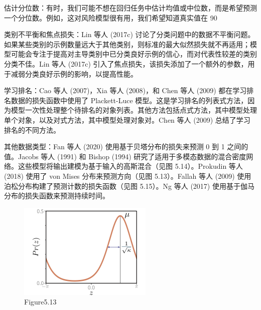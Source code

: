 估计分位数：有时，我们可能不想在回归任务中估计均值或中位数，而是希望预测一个分位数。例如，这对风险模型很有用，我们希望知道真实值在 90%

类别不平衡和焦点损失：Lin 等人 (2017c) 讨论了分类问题中的数据不平衡问题。如果某些类别的示例数量远大于其他类别，则标准的最大似然损失就不再适用；模型可能会专注于提高对主导类别中已分类良好示例的信心，而对代表性较差的类别分类不佳。Lin 等人 (2017c) 引入了焦点损失，该损失添加了一个额外的参数，用于减弱分类良好示例的影响，以提高性能。

学习排名：Cao 等人 (2007)，Xia 等人 (2008)，和 Chen 等人 (2009) 都在学习排名数据的损失函数中使用了 Plackett-Luce 模型。这是学习排名的列表式方法，因为模型一次性处理整个待排名的对象列表。其他方法包括点式方法，其中模型处理单个对象，以及对式方法，其中模型处理对象对。Chen 等人 (2009) 总结了学习排名的不同方法。

其他数据类型：Fan 等人 (2020) 使用基于贝塔分布的损失来预测 0 到 1 之间的值。Jacobs 等人 (1991) 和 Bishop (1994) 研究了适用于多模态数据的混合密度网络。这些模型将输出建模为基于输入的高斯混合（见图 5.14）。Prokudin 等人 (2018) 使用了 von Mises 分布来预测方向（见图 5.13）。Fallah 等人 (2009) 使用泊松分布构建了预测计数的损失函数（见图 5.15）。Ng 等人 (2017) 使用基于伽马分布的损失函数来预测持续时间。

\begin{figure}[ht!]
	\centering
	\includegraphics[width=0.7\linewidth]{png/chapter5/LossVonMises.png}
	\caption{Figure5.13}
\end{figure}

